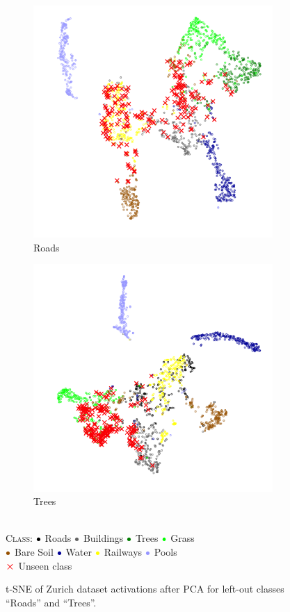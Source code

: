 \documentclass[10pt]{article}
\newcommand{\legendBullet}{
    \textsc{Class}: 
    ${\color{black}\bullet}$ Roads
    ${\color{buildings}\bullet}$ Buildings
    ${\color{trees}\bullet}$ Trees
    ${\color{grass}\bullet}$ Grass\\
    ${\color{baresoil}\bullet}$ Bare Soil
    ${\color{water}\bullet}$ Water
    ${\color{railways}\bullet}$ Railways
    ${\color{swimmingpools}\bullet}$ Pools\\
    ${\color{unseen}\boldsymbol{\times}}$ Unseen class
    }
\begin{document}
\begin{figure}[H]
    \centering
    \begin{subfigure}{.49\textwidth}
        \centering
        \includegraphics[width=\textwidth]{t-SNE_wo_cl1_after_PCA}
        \caption{Roads}
    \end{subfigure}
    \begin{subfigure}{.5\textwidth}
        \centering
        \includegraphics[width=\textwidth]{t-SNE_wo_cl3_after_PCA}
        \caption{Trees}
    \end{subfigure}
    \\[.2cm]
    \legendBullet
    \caption{\gls{t-SNE} of Zurich dataset activations after \gls{PCA} for left-out classes ``Roads'' and ``Trees''.}
    \label{fig:tsne-zurich-miscl}
\end{figure}
\end{document}

